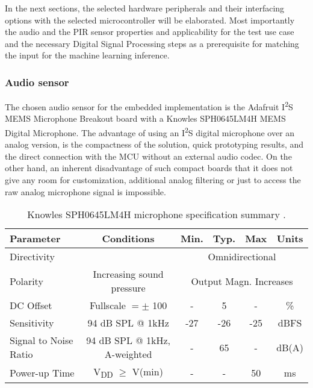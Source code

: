 In the next sections, the selected hardware peripherals and their interfacing options with the selected microcontroller will be elaborated. Most importantly the audio and the PIR sensor properties and applicability for the test use case and the necessary Digital Signal Processing steps as a prerequisite for matching the input for the machine learning inference.


\subsubsection{Audio sensor}
\label{subsub:Aud_sensor}

The chosen audio sensor for the embedded implementation is the Adafruit I\textsuperscript{2}S MEMS Microphone Breakout board with a Knowles SPH0645LM4H MEMS Digital Microphone. The advantage of using an I\textsuperscript{2}S digital microphone over an analog version, is the compactness of the solution, quick prototyping results, and the direct connection with the MCU without an external audio codec. On the other hand, an inherent disadvantage of such compact boards that it does not give any room for customization, additional analog filtering or just to access the raw analog microphone signal is impossible.


\begin{table}[h!]
\centering
\begin{adjustbox}{max width=1\textwidth}
\begin{tabular}{|l|c|c|c|c|c|}
\hline
\textbf{Parameter}             & \textbf{Conditions}                    & \textbf{Min.}        & \textbf{Typ.}        & \textbf{Max}        & \textbf{Units}      \\ \hline
Directivity           &                              & \multicolumn{4}{c|}{Omnidirectional}            \\ \hline
Polarity              & Increasing sound pressure    & \multicolumn{4}{c|}{Output Magn. Increases} \\ \hline
DC Offset             & Fullscale $= \pm $  100    & -          & 5          & -         & \%        \\ \hline
Sensitivity           & 94 dB SPL @ 1kHz             & -27        & -26        & -25       & dBFS      \\ \hline
Signal to Noise Ratio & 94 dB SPL @ 1kHz, A-weighted & -          & 65         & -         & dB(A)     \\ \hline
Power-up Time         & V\textsubscript{DD} $\geq$ V(min) & -          & -          & 50        & ms        \\ \hline
\end{tabular}

\end{adjustbox}

\caption{Knowles SPH0645LM4H microphone specification summary \cite{knowles_mems}.}
\end{table}

